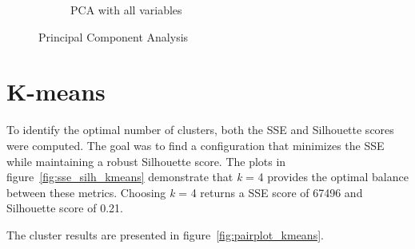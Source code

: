 \begin{figure}[h]
\begin{subfigure}[b]{0.49\textwidth}
        \caption{PCA with all variables}
        \label{fig:pca5}
    \end{subfigure}
    \caption{Principal Component Analysis}
    \label{fig:pca_diff}
\end{figure}

\section{K-means}\label{sec:centroid_based}

To identify the optimal number of clusters, both the SSE and Silhouette scores were computed. The goal was to find a configuration that minimizes the SSE while maintaining a robust Silhouette score. 
The plots in figure~\ref{fig:sse_silh_kmeans} demonstrate that \textit{k} = 4 provides the optimal balance between these metrics. Choosing \textit{k} = 4 returns a SSE score of 67496 and Silhouette score of 0.21. 

The cluster results are presented in figure~\ref{fig:pairplot_kmeans}. 

